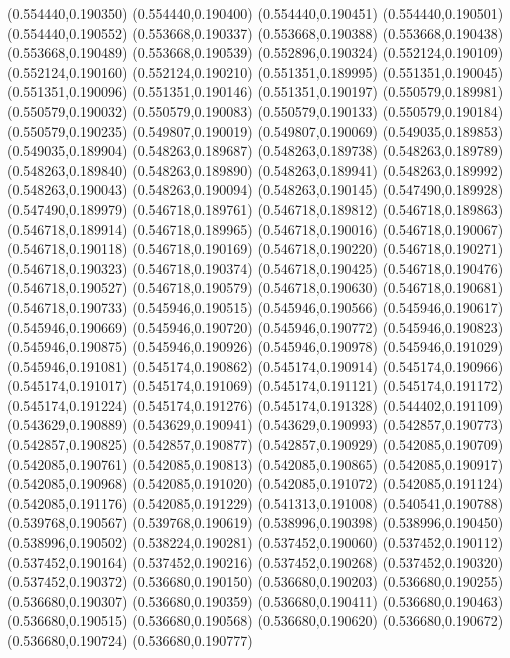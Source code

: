 (0.554440,0.190350)
(0.554440,0.190400)
(0.554440,0.190451)
(0.554440,0.190501)
(0.554440,0.190552)
(0.553668,0.190337)
(0.553668,0.190388)
(0.553668,0.190438)
(0.553668,0.190489)
(0.553668,0.190539)
(0.552896,0.190324)
(0.552124,0.190109)
(0.552124,0.190160)
(0.552124,0.190210)
(0.551351,0.189995)
(0.551351,0.190045)
(0.551351,0.190096)
(0.551351,0.190146)
(0.551351,0.190197)
(0.550579,0.189981)
(0.550579,0.190032)
(0.550579,0.190083)
(0.550579,0.190133)
(0.550579,0.190184)
(0.550579,0.190235)
(0.549807,0.190019)
(0.549807,0.190069)
(0.549035,0.189853)
(0.549035,0.189904)
(0.548263,0.189687)
(0.548263,0.189738)
(0.548263,0.189789)
(0.548263,0.189840)
(0.548263,0.189890)
(0.548263,0.189941)
(0.548263,0.189992)
(0.548263,0.190043)
(0.548263,0.190094)
(0.548263,0.190145)
(0.547490,0.189928)
(0.547490,0.189979)
(0.546718,0.189761)
(0.546718,0.189812)
(0.546718,0.189863)
(0.546718,0.189914)
(0.546718,0.189965)
(0.546718,0.190016)
(0.546718,0.190067)
(0.546718,0.190118)
(0.546718,0.190169)
(0.546718,0.190220)
(0.546718,0.190271)
(0.546718,0.190323)
(0.546718,0.190374)
(0.546718,0.190425)
(0.546718,0.190476)
(0.546718,0.190527)
(0.546718,0.190579)
(0.546718,0.190630)
(0.546718,0.190681)
(0.546718,0.190733)
(0.545946,0.190515)
(0.545946,0.190566)
(0.545946,0.190617)
(0.545946,0.190669)
(0.545946,0.190720)
(0.545946,0.190772)
(0.545946,0.190823)
(0.545946,0.190875)
(0.545946,0.190926)
(0.545946,0.190978)
(0.545946,0.191029)
(0.545946,0.191081)
(0.545174,0.190862)
(0.545174,0.190914)
(0.545174,0.190966)
(0.545174,0.191017)
(0.545174,0.191069)
(0.545174,0.191121)
(0.545174,0.191172)
(0.545174,0.191224)
(0.545174,0.191276)
(0.545174,0.191328)
(0.544402,0.191109)
(0.543629,0.190889)
(0.543629,0.190941)
(0.543629,0.190993)
(0.542857,0.190773)
(0.542857,0.190825)
(0.542857,0.190877)
(0.542857,0.190929)
(0.542085,0.190709)
(0.542085,0.190761)
(0.542085,0.190813)
(0.542085,0.190865)
(0.542085,0.190917)
(0.542085,0.190968)
(0.542085,0.191020)
(0.542085,0.191072)
(0.542085,0.191124)
(0.542085,0.191176)
(0.542085,0.191229)
(0.541313,0.191008)
(0.540541,0.190788)
(0.539768,0.190567)
(0.539768,0.190619)
(0.538996,0.190398)
(0.538996,0.190450)
(0.538996,0.190502)
(0.538224,0.190281)
(0.537452,0.190060)
(0.537452,0.190112)
(0.537452,0.190164)
(0.537452,0.190216)
(0.537452,0.190268)
(0.537452,0.190320)
(0.537452,0.190372)
(0.536680,0.190150)
(0.536680,0.190203)
(0.536680,0.190255)
(0.536680,0.190307)
(0.536680,0.190359)
(0.536680,0.190411)
(0.536680,0.190463)
(0.536680,0.190515)
(0.536680,0.190568)
(0.536680,0.190620)
(0.536680,0.190672)
(0.536680,0.190724)
(0.536680,0.190777)
